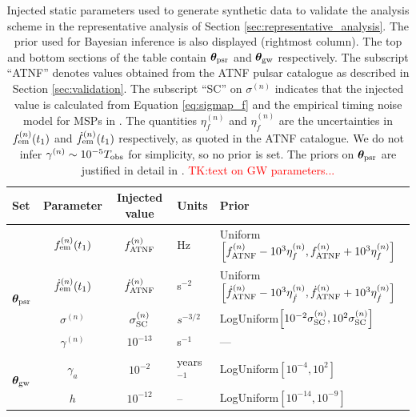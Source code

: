 \documentclass[fleqn,usenatbib,useAMS]{mnras}
\begin{document}
\begin{table}
	\centering
		\begin{tabular}{lccll}
			\toprule
			Set&Parameter & Injected value & Units & Prior  \\
			\hline
			\vspace{1mm}& $f_{\rm em}^{(n)} (t_1)$       & $f_{\rm ATNF}^{(n)}$ & Hz & Uniform$\left[f_{\rm ATNF}^{(n)} - 10^3 \eta^{(n)}_{f}, f_{\rm ATNF}^{(n)} + 10^3 \eta^{(n)}_{f} \right]$ \\
			\multirow{2}{2mm}{$\boldsymbol{\theta}_{\rm psr}$} & $\dot{f}_{\rm em}^{(n)} (t_1)$       & $\dot{f}_{\rm ATNF}^{(n)}$ & s$^{-2}$ & Uniform$\left[ \dot{f}_{\rm ATNF}^{(n)} - 10^3 \eta^{(n)}_{\dot{f}}, \dot{f}_{\rm ATNF}^{(n)} + 10^3 \eta^{(n)}_{\dot{f}} \right]$ \\
			& $\sigma^{(n)}$              & $\sigma_{\rm SC}^{(n)}$ & $s^{-3/2}$ & LogUniform$ \left [10^{-2} \sigma_{\rm SC}^{(n)}, 10^2 \sigma_{\rm SC}^{(n)} \right ]$ \\
			& $\gamma^{(n)}$              & $10^{-13}$ & s$^{-1}$ & --- \\
			\hline 
			\multirow{2}{2mm}{$\boldsymbol{\theta}_{\rm gw}$} & $\gamma_a$     & $10^{-2}$ & years$^{-1}$ & LogUniform$\left[10^{-4},10^{2}\right]$\\
			& $h$              & $10^{-12}$ & -- &  LogUniform$\left[10^{-14},10^{-9}\right]$\\
			\bottomrule
		\end{tabular}
		\caption{Injected static parameters used to generate synthetic data to validate the analysis scheme in the representative analysis of Section \ref{sec:representative_analysis}. The prior used for Bayesian inference is also displayed (rightmost column).  The top and bottom sections of the table contain $\boldsymbol{\theta}_{\rm psr}$ and $\boldsymbol{\theta}_{\rm gw}$ respectively. The subscript ``ATNF'' denotes values obtained from the ATNF pulsar catalogue as described in Section \ref{sec:validation}. The subscript ``SC'' on $\sigma^{(n)}$ indicates that the injected value is calculated from Equation \eqref{eq:sigmap_f} and the empirical timing noise model for MSPs in \protect \cite{Shannon2010}. The quantities $\eta^{(n)}_{f}$ and $\eta^{(n)}_{\dot{f}}$ are the uncertainties in $f^{(n)}_{\rm em} (t_1)$ and $\dot{f}^{(n)}_{\rm em} (t_1)$ respectively, as quoted in the ATNF catalogue. We do not infer $\gamma^{(n)} \sim 10^{-5} T_{\rm obs}$ for simplicity, so no prior is set. The priors on $\boldsymbol{\theta}_{\rm psr}$ are justified in detail in \citet{KimpsonPTA1,KimpsonPTA2}. \textcolor{red}{TK:text on GW parameters...} }
		\label{tab:parameters_and_priors}
	\end{table}
\end{document}
